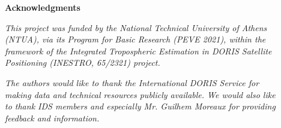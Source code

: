\documentclass[final,a0,portrait]{beamer}
\newlength{\sepwid}
\newlength{\onecolwid}
\newlength{\twocolwid}
\begin{document}
\begin{frame}[t]
\begin{columns}[t]
\begin{column}{\onecolwid}
\begin{minipage}{\twocolwid}
\vspace*{1.0\baselineskip}
\begin{center}
\textbf{Acknowledgments}
\end{center}
\par\textit{\footnotesize This project was funded by the National Technical 
University of Athens (NTUA), via its Program for Basic Research (PEVE 2021), 
within the framework of the \emph{Integrated Tropospheric Estimation in DORIS 
Satellite Positioning} (INESTRO, 65/2321) project.}

\par\textit{\footnotesize The authors would like to thank the International DORIS 
Service for making data and technical resources publicly available. We would also 
like to thank IDS members and especially Mr. Guilhem Moreaux for providing 
feedback and information.}
\end{minipage}
%




\end{column} %

\begin{column}{\sepwid}\end{column}

\begin{column}{\onecolwid} 



\end{column}
\end{columns}
\end{frame}
\end{document}
